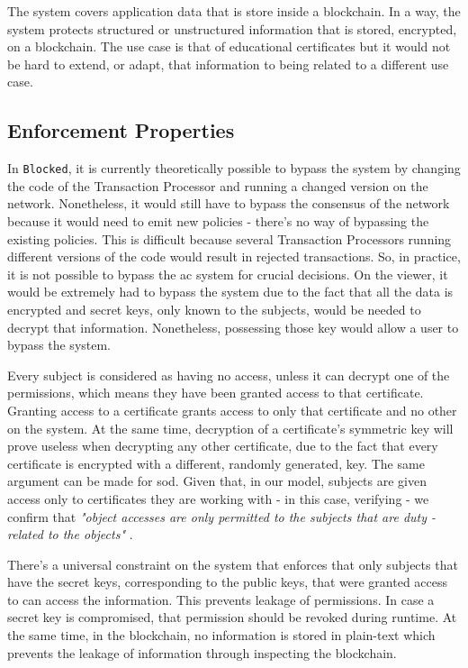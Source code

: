 The system covers application data that is store inside a blockchain. In a way, the system protects structured or unstructured information that is stored, encrypted, on a blockchain. The use case is that of educational certificates but it would not be hard to extend, or adapt, that information to being related to a different use case.

\subsection{Enforcement Properties}

In \texttt{Blocked}, it is currently theoretically possible to bypass the system by changing the code of the Transaction Processor and running a changed version on the network. Nonetheless, it would still have to bypass the consensus of the network because it would need to emit new policies - there's no way of bypassing the existing policies. This is difficult because several Transaction Processors running different versions of the code would result in rejected transactions. So, in practice, it is not possible to bypass the \gls{ac} system for crucial decisions. On the viewer, it would be extremely had to bypass the system due to the fact that all the data is encrypted and secret keys, only known to the subjects, would be needed to decrypt that information. Nonetheless, possessing those key would allow a user to bypass the system.

Every subject is considered as having no access, unless it can decrypt one of the permissions, which means they have been granted access to that certificate. Granting access to a certificate grants access to only that certificate and no other on the system. At the same time, decryption of a certificate's symmetric key will prove useless when decrypting any other certificate, due to the fact that every certificate is encrypted with a different, randomly generated, key. The same argument can be made for \gls{sod}. Given that, in our model, subjects are given access only to certificates they are working with - in this case, verifying - we confirm that \emph{"object accesses are only permitted to the subjects that are duty
	-related to the objects"} \cite[17]{hu_guidelines_2012}.

There's a universal constraint on the system that enforces that only subjects that have the secret keys, corresponding to the public keys, that were granted access to can access the information. This prevents leakage of permissions. In case a secret key is compromised, that permission should be revoked during runtime. At the same time, in the blockchain, no information is stored in plain-text which prevents the leakage of information through inspecting the blockchain.


